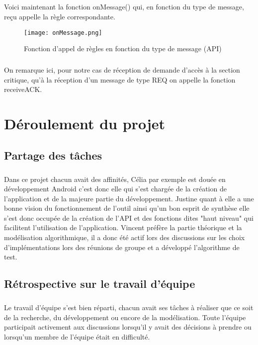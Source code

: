 \documentclass[a4paper,10pt]{report}
\begin{document}
\paragraph{}
Voici maintenant la fonction onMessage() qui, en fonction du type de message, reçu appelle la règle correspondante.

\begin{figure}[h]
    \hspace{-3cm}
    \texttt{[image: onMessage.png]}
    \caption{Fonction d'appel de règles en fonction du type de message (API)}
\end{figure}
\paragraph{}
On remarque ici, pour notre cas de réception de demande d'accès à la section critique, qu'à la réception d'un message de type REQ on appelle la fonction receiveACK.

\chapter{Déroulement du projet}
 \section{Partage des tâches}
 \paragraph{}
 Dans ce projet chacun avait des affinités, Célia par exemple est douée en développement Android c'est donc elle qui s'est chargée de la création de l'application et de la majeure partie du développement. Justine quant à elle a une bonne vision du fonctionnement de l'outil ainsi qu'un bon esprit de synthèse elle s'est donc occupée de la création de l'API et des fonctions dites "haut niveau" qui facilitent l'utilisation de l'application. Vincent préfère la partie théorique et la modélisation algorithmique, il a donc été actif lors des discussions sur les choix d'implémentations lors des réunions de groupe et a développé l'algorithme de test.
 \section{Rétrospective sur le travail d'équipe}
 \paragraph{}
 Le travail d'équipe s'est bien réparti, chacun avait ses tâches à réaliser que ce soit de la recherche, du développement ou encore de la modélisation. Toute l'équipe participait activement aux discussions lorsqu'il y avait des décisions à prendre ou lorsqu'un membre de l'équipe était en difficulté.
\end{document}
